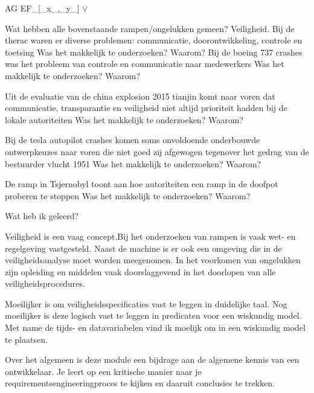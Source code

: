 AG EF_[_x_,_y_] $\vee$


Wat hebben alle bovenstaande rampen/ongelukken gemeen? Veiligheid.
Bij de therac waren er diverse problemen: communicatie, doorontwikkeling, controle en toetsing
Was het makkelijk te onderzoeken? Waarom?
Bij de boeing 737 crashes was het probleem van controle en communicatie naar medewerkers
Was het makkelijk te onderzoeken? Waarom?

Uit de evaluatie van de china explosion 2015 tianjin komt naar voren dat communicatie, transparantie en veiligheid niet altijd prioriteit hadden bij de lokale autoriteiten
Was het makkelijk te onderzoeken? Waarom?

Bij de tesla autopilot crashes komen soms onvoldoende onderbouwde ontwerpkeuzes naar voren die niet goed zij  afgewogen tegenover het gedrag van de bestuurder
vlucht 1951
Was het makkelijk te onderzoeken? Waarom?

De ramp in Tsjernobyl toont aan hoe autoriteiten een ramp in de doofpot proberen te stoppen
Was het makkelijk te onderzoeken? Waarom?



Wat heb ik geleerd?


Veiligheid is een vaag concept.Bij het onderzoeken van rampen is vaak wet- en regelgeving vastgesteld. Naast de machine is er ook een omgeving die in de veiligheidsanalyse moet worden meegenomen. In het voorkomen van ongelukken zijn opleiding en middelen  vaak doorslaggevend in het doorlopen van alle veiligheidsprocedures.

Moeilijker is om veiligheidsspecificaties vast te leggen in duidelijke taal. Nog moeilijker is deze logisch vast te leggen in predicaten voor een wiskundig model. Met name de tijds- en datavariabelen  vind ik moelijk om in een wiskundig model te plaatsen.

Over het algemeen is deze module een bijdrage aan de algemene kennis van een ontwikkelaar. Je leert op een kritische manier naar je requirementsengineeringproces te kijken en daaruit conclusies te trekken.



